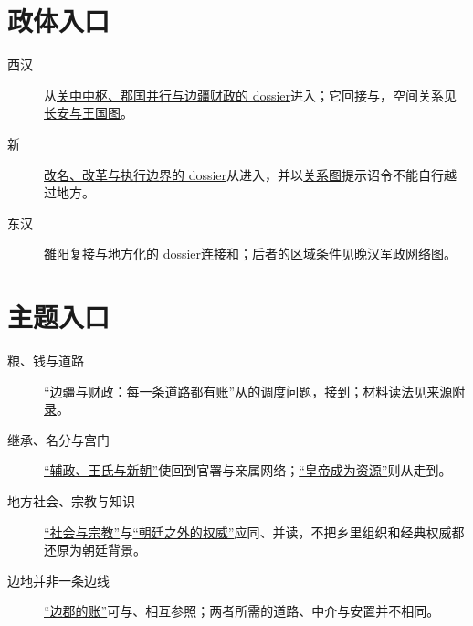 \section{政体入口}

\begin{description}
  \item[西汉] 从\hyperref[sec:polity-western-han]{关中中枢、郡国并行与边疆财政的 dossier}进入；它回接与，空间关系见\hyperref[fig:changan-feudal-constraints]{长安与王国图}。
  \item[新] \hyperref[sec:polity-xin]{改名、改革与执行边界的 dossier}从进入，并以\hyperref[fig:xin-reform-fracture]{关系图}提示诏令不能自行越过地方。
  \item[东汉] \hyperref[sec:polity-eastern-han]{雒阳复接与地方化的 dossier}连接和；后者的区域条件见\hyperref[fig:late-han-regions]{晚汉军政网络图}。
\end{description}

\section{主题入口}

\begin{description}
  \item[粮、钱与道路] \hyperref[sec:synthesis-frontier-fiscal]{“边疆与财政：每一条道路都有账”}从的调度问题，接到；材料读法见\hyperref[app:sources]{来源附录}。
  \item[继承、名分与宫门] \hyperref[sec:han-regency-new]{“辅政、王氏与新朝”}使回到官署与亲属网络；\hyperref[sec:eastern-han-breakdown]{“皇帝成为资源”}则从走到。
  \item[地方社会、宗教与知识] \hyperref[sec:synthesis-social-religious]{“社会与宗教”}与\hyperref[sec:eastern-han-court-society]{“朝廷之外的权威”}应同、并读，不把乡里组织和经典权威都还原为朝廷背景。
  \item[边地并非一条边线] \hyperref[sec:eastern-han-frontier-fiscal]{“边郡的账”}可与、相互参照；两者所需的道路、中介与安置并不相同。
\end{description}

